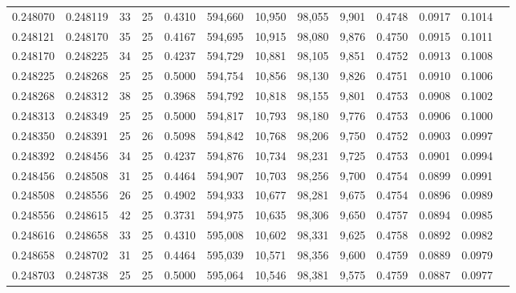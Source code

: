 \begin{tabular}{rrrrrrrrrrrrr}
0.248070 & 0.248119 &    33 &  25 &                                     0.4310 & 594,660 &  10,950 &  98,055 &   9,901 & 0.4748 & 0.0917 & 0.1014 \\
0.248121 & 0.248170 &    35 &  25 &                                     0.4167 & 594,695 &  10,915 &  98,080 &   9,876 & 0.4750 & 0.0915 & 0.1011 \\
0.248170 & 0.248225 &    34 &  25 &                                     0.4237 & 594,729 &  10,881 &  98,105 &   9,851 & 0.4752 & 0.0913 & 0.1008 \\
0.248225 & 0.248268 &    25 &  25 &                                     0.5000 & 594,754 &  10,856 &  98,130 &   9,826 & 0.4751 & 0.0910 & 0.1006 \\
0.248268 & 0.248312 &    38 &  25 &                                     0.3968 & 594,792 &  10,818 &  98,155 &   9,801 & 0.4753 & 0.0908 & 0.1002 \\
0.248313 & 0.248349 &    25 &  25 &                                     0.5000 & 594,817 &  10,793 &  98,180 &   9,776 & 0.4753 & 0.0906 & 0.1000 \\
0.248350 & 0.248391 &    25 &  26 &                                     0.5098 & 594,842 &  10,768 &  98,206 &   9,750 & 0.4752 & 0.0903 & 0.0997 \\
0.248392 & 0.248456 &    34 &  25 &                                     0.4237 & 594,876 &  10,734 &  98,231 &   9,725 & 0.4753 & 0.0901 & 0.0994 \\
0.248456 & 0.248508 &    31 &  25 &                                     0.4464 & 594,907 &  10,703 &  98,256 &   9,700 & 0.4754 & 0.0899 & 0.0991 \\
0.248508 & 0.248556 &    26 &  25 &                                     0.4902 & 594,933 &  10,677 &  98,281 &   9,675 & 0.4754 & 0.0896 & 0.0989 \\
0.248556 & 0.248615 &    42 &  25 &                                     0.3731 & 594,975 &  10,635 &  98,306 &   9,650 & 0.4757 & 0.0894 & 0.0985 \\
0.248616 & 0.248658 &    33 &  25 &                                     0.4310 & 595,008 &  10,602 &  98,331 &   9,625 & 0.4758 & 0.0892 & 0.0982 \\
0.248658 & 0.248702 &    31 &  25 &                                     0.4464 & 595,039 &  10,571 &  98,356 &   9,600 & 0.4759 & 0.0889 & 0.0979 \\
0.248703 & 0.248738 &    25 &  25 &                                     0.5000 & 595,064 &  10,546 &  98,381 &   9,575 & 0.4759 & 0.0887 & 0.0977 \\

\end{tabular}
